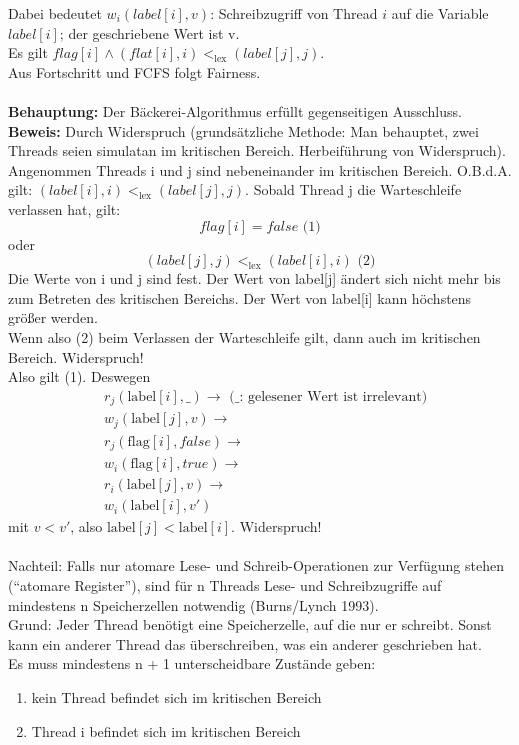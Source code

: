 Dabei bedeutet $w_i\left(label[i], v\right)$: Schreibzugriff von Thread $i$ auf die Variable $label[i]$; der geschriebene Wert ist v.\\
Es gilt $flag[i] \land \left(flat[i], i\right) <_\text{lex} \left(label[j], j\right)$.\\
Aus Fortschritt und FCFS folgt Fairness.\\
\\
\textbf{Behauptung:} Der Bäckerei-Algorithmus erfüllt gegenseitigen Ausschluss.\\
\textbf{Beweis:} Durch Widerspruch (grundsätzliche Methode: Man behauptet, zwei Threads seien simulatan im kritischen Bereich. Herbeiführung von Widerspruch). Angenommen Threads i und j sind nebeneinander im kritischen Bereich. O.B.d.A. gilt: $\left(label[i], i\right) <_\text{lex} \left(label[j], j\right)$. Sobald Thread j die Warteschleife verlassen hat, gilt:
\begin{equation*}
	flag[i] = false \text{ (1)}
\end{equation*}
oder
\begin{equation*}
	\left(label[j], j\right) <_\text{lex} \left(label[i], i\right) \text{ (2)}
\end{equation*}
Die Werte von i und j sind fest. Der Wert von label[j] ändert sich nicht mehr bis zum Betreten des kritischen Bereichs. Der Wert von label[i] kann höchstens größer werden.\\
Wenn also (2) beim Verlassen der Warteschleife gilt, dann auch im kritischen Bereich. Widerspruch!\\
Also gilt (1). Deswegen 
\begin{align*}
&	r_j\left(\text{label}[i], \_\right) \rightarrow \text{ (\_: gelesener Wert ist irrelevant)}\\
&	w_j\left(\text{label}[j], v\right) \rightarrow\\
&	r_j\left(\text{flag}[i], false\right) \rightarrow\\
&	w_i\left(\text{flag}[i], true\right) \rightarrow\\
&	r_i\left(\text{label}[j], v\right) \rightarrow\\
&	w_i\left(\text{label}[i], v'\right)
\end{align*}
mit $v < v'$, also $\text{label}[j] < \text{label}[i]$. Widerspruch!\\
\\
Nachteil: Falls nur atomare Lese- und Schreib-Operationen zur Verfügung stehen ("`atomare Register"'), sind für n Threads Lese- und Schreibzugriffe auf mindestens n Speicherzellen notwendig (Burns/Lynch 1993).\\
Grund: Jeder Thread benötigt eine Speicherzelle, auf die nur er schreibt. Sonst kann ein anderer Thread das überschreiben, was ein anderer geschrieben hat.\\
Es muss mindestens n + 1 unterscheidbare Zustände geben: 
\begin{enumerate}
	\item kein Thread befindet sich im kritischen Bereich
	\item Thread i befindet sich im kritischen Bereich
\end{enumerate}